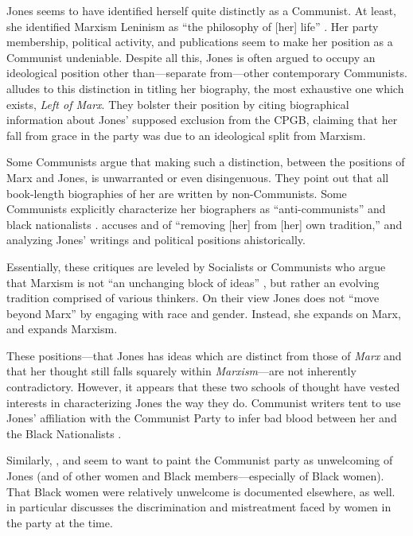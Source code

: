 \documentclass[man,12pt,natbib]{apa6}
\begin{document}
Jones seems to have identified herself quite distinctly as a Communist. At least,
she identified Marxism Leninism as ``the philosophy of [her] life''
\citep{Lalkar, Carter86}.  Her party membership, political activity, and 
publications seem to make her position as a Communist undeniable. Despite all this,
Jones is often argued to occupy an ideological position other than---separate
from---other contemporary Communists. \citet{Davies08} alludes to this
distinction in titling her biography, the most exhaustive one which exists,
\emph{Left of Marx}. They bolster their position by citing biographical
information about Jones' supposed exclusion from the CPGB, claiming that her fall
from grace in the party was due to an ideological split from Marxism.

Some Communists argue that making such a distinction, between the positions of
Marx and Jones, is unwarranted or even disingenuous. They point out that all
book-length biographies of her \citep{Davies08, Sherwood00} are written by
non-Communists. Some Communists explicitly characterize her biographers as
``anti-communists'' and black nationalists \citep{Lalkar}. \citet{Olende14}
accuses \citet{Davies08} and \citet{McDuffie11} of ``removing [her] from [her]
own tradition,'' and analyzing Jones' writings and political positions
ahistorically.

Essentially, these critiques are leveled by Socialists or Communists who argue 
that Marxism is not ``an unchanging block of ideas'' \citep{Olende14}, but rather
an evolving tradition comprised of various thinkers. On their view Jones does not
``move beyond Marx'' \citep{Olende14} by engaging with race and gender. Instead, 
she expands on Marx, and expands Marxism.

These positions---that Jones has ideas which are distinct from those of
\emph{Marx} and that her thought still falls squarely within
\emph{Marxism}---are not inherently contradictory.  However, it appears that
these two schools of thought have vested interests in characterizing Jones the
way they do. Communist writers tent to use Jones' affiliation with the
Communist Party to infer bad blood between her and the Black Nationalists
\citep{Lalkar, Olende14}.

Similarly, \citet{Sherwood00}, \citet{Davies08} and \citet{McDuffie11} seem to
want to paint the Communist party as unwelcoming of Jones (and of other women
and Black members---especially of Black women). That Black women were
relatively unwelcome is documented elsewhere, as well. \citet{Weigand01} in
particular discusses the discrimination and mistreatment faced by women in the
party at the time.
\end{document}
